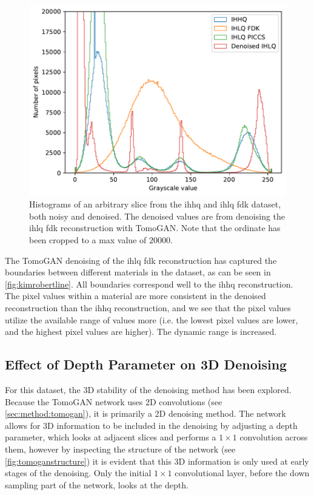 \begin{figure}[htbp]
  \centering
  \includegraphics[width=.9\textwidth]{figures/kimroberthist.pdf}
  \caption[Histograms of IHHQ and IHLQ, noisy and denoised]{Histograms of an arbitrary slice from the \gls{ihhq} and \gls{ihlq} \gls{fdk} dataset, both noisy and denoised. The denoised values are from denoising the \gls{ihlq} \gls{fdk} reconstruction with TomoGAN. Note that the ordinate has been cropped to a max value of $20000$. }
  \label{fig:kimroberthist}
\end{figure}

The TomoGAN denoising of the \gls{ihlq} \gls{fdk} reconstruction has captured the boundaries between different materials in the dataset, as can be seen in \cref{fig:kimrobertline}. All boundaries correspond well to the \gls{ihhq} reconstruction. The pixel values within a material are more consistent in the denoised reconstruction than the \gls{ihhq} reconstruction, and we see that the pixel values utilize the available range of values more (i.e. the lowest pixel values are lower, and the highest pixel values are higher). The dynamic range is increased. 


\subsection{Effect of Depth Parameter on 3D Denoising}
For this dataset, the 3D stability of the denoising method has been explored. Because the TomoGAN network uses 2D convolutions (see \cref{sec:method:tomogan}), it is primarily a 2D denoising method. The network allows for 3D information to be included in the denoising by adjusting a depth parameter, which looks at adjacent slices and performs a $1\times1$ convolution across them, however by inspecting the structure of the network (see \cref{fig:tomoganstructure}) it is evident that this 3D information is only used at early stages of the denoising. Only the initial $1\times1$ convolutional layer, before the down sampling part of the network, looks at the depth. 

